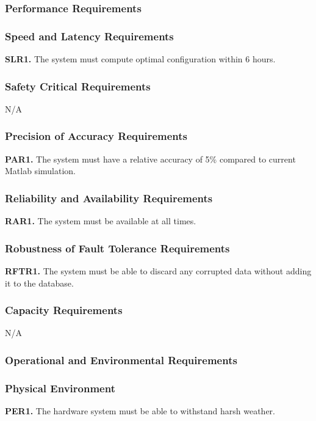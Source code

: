 \documentclass[12pt, titlepage]{article}
\begin{document}
\subsubsection{Performance Requirements}
\subsubsection{Speed and Latency Requirements}
\textbf{SLR1.} The system must compute optimal configuration within 6 hours.

\subsubsection{Safety Critical Requirements}
N/A

\subsubsection{Precision of Accuracy Requirements}
\textbf{PAR1.} The system must have a relative accuracy of 5\% compared to current Matlab simulation.

\subsubsection{Reliability and Availability Requirements}
\textbf{RAR1.} The system must be available at all times.\\

\subsubsection{Robustness of Fault Tolerance Requirements}
\textbf{RFTR1.} The system must be able to discard any corrupted data without adding it to the database.\\

\subsubsection{Capacity Requirements}
N/A

\subsubsection{Operational and Environmental Requirements}
\subsubsection{Physical Environment}
\textbf{PER1.} The hardware system must be able to withstand harsh weather.
\end{document}
